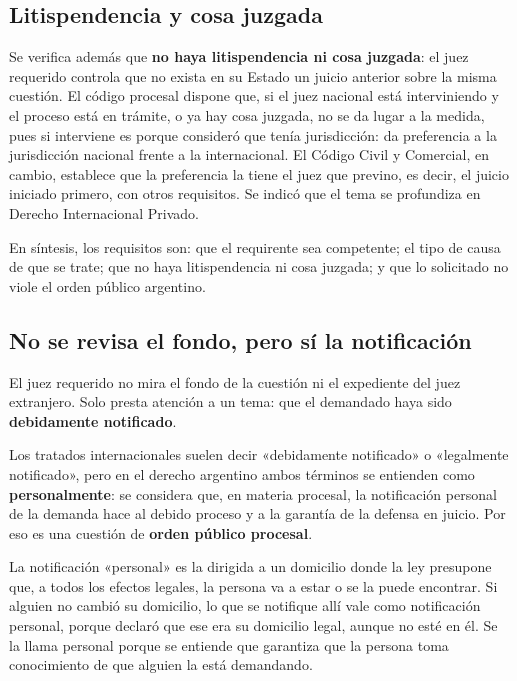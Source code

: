 \documentclass[12pt,oneside]{book}
\begin{document}

\subsection{Litispendencia y cosa juzgada}

Se verifica además que \textbf{no haya litispendencia ni cosa juzgada}: el juez requerido controla que no exista en su Estado un juicio anterior sobre la misma cuestión. El código procesal dispone que, si el juez nacional está interviniendo y el proceso está en trámite, o ya hay cosa juzgada, no se da lugar a la medida, pues si interviene es porque consideró que tenía jurisdicción: da preferencia a la jurisdicción nacional frente a la internacional. El Código Civil y Comercial, en cambio, establece que la preferencia la tiene el juez que previno, es decir, el juicio iniciado primero, con otros requisitos. Se indicó que el tema se profundiza en Derecho Internacional Privado.

En síntesis, los requisitos son: que el requirente sea competente; el tipo de causa de que se trate; que no haya litispendencia ni cosa juzgada; y que lo solicitado no viole el orden público argentino.

\subsection{No se revisa el fondo, pero sí la notificación}

\begin{important}
El juez requerido no mira el fondo de la cuestión ni el expediente del juez extranjero. Solo presta atención a un tema: que el demandado haya sido \textbf{debidamente notificado}.
\end{important}

Los tratados internacionales suelen decir «debidamente notificado» o «legalmente notificado», pero en el derecho argentino ambos términos se entienden como \textbf{personalmente}: se considera que, en materia procesal, la notificación personal de la demanda hace al debido proceso y a la garantía de la defensa en juicio. Por eso es una cuestión de \textbf{orden público procesal}.

La notificación «personal» es la dirigida a un domicilio donde la ley presupone que, a todos los efectos legales, la persona va a estar o se la puede encontrar. Si alguien no cambió su domicilio, lo que se notifique allí vale como notificación personal, porque declaró que ese era su domicilio legal, aunque no esté en él. Se la llama personal porque se entiende que garantiza que la persona toma conocimiento de que alguien la está demandando.
\end{document}
